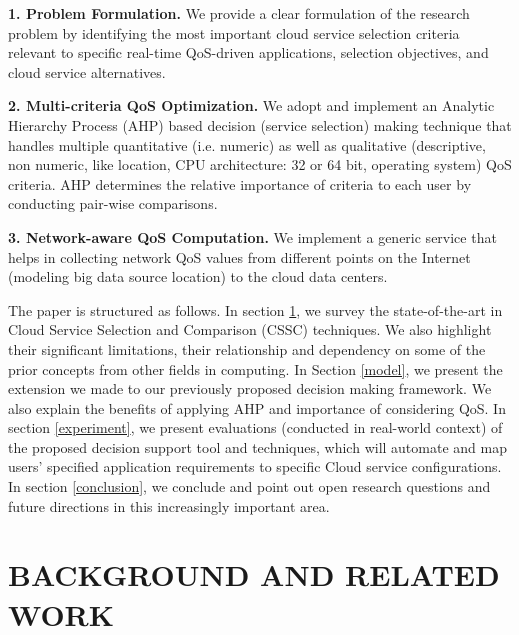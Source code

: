 \documentclass[journal]{IEEEtran}
\begin{document}
\textbf{1. Problem Formulation.} We provide a clear formulation of the research problem by identifying the most important cloud service selection criteria relevant to specific real-time QoS-driven applications, selection objectives, and cloud service alternatives.

\textbf{2. Multi-criteria QoS Optimization.} We adopt and implement an Analytic Hierarchy Process (AHP) based decision (service selection) making technique that handles multiple quantitative (i.e. numeric) as well as qualitative (descriptive, non numeric, like location, CPU architecture: 32 or 64 bit, operating system) QoS criteria. AHP determines the relative importance of criteria to each user by conducting pair-wise comparisons.

\textbf{3. Network-aware QoS Computation.} We implement a generic service that helps in collecting network QoS values from different points on the Internet (modeling big data source location) to the cloud data centers.

The paper is structured as follows. In section \ref{related}, we survey the state-of-the-art in Cloud Service Selection and Comparison (CSSC) techniques. We also highlight their significant limitations, their relationship and dependency on some of the prior concepts from other fields in computing. In Section \ref{model}, we present the extension we made to our previously proposed decision making framework. We also explain the benefits of applying AHP and importance of considering QoS. In section \ref{experiment}, we present evaluations (conducted in real-world context) of the proposed decision support tool and techniques, which will automate and map users' specified application requirements to specific Cloud service configurations. In section \ref{conclusion}, we conclude and point out open research questions and future directions in this increasingly important area.



\section{BACKGROUND AND RELATED WORK}\label{related}
\end{document}

